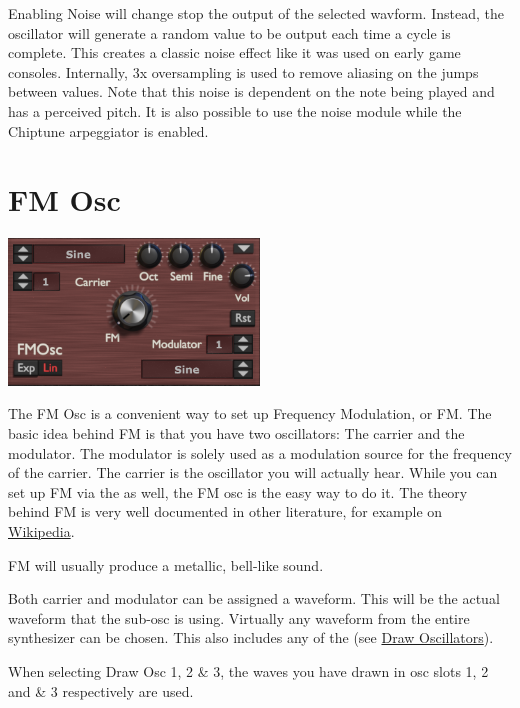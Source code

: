 {Enabling Noise will change stop the output of the selected wavform. Instead, the oscillator will generate a random value to be output each time a cycle is complete. This creates a classic noise effect like it was used on early game consoles. Internally, 3x oversampling is used to remove aliasing on the jumps between values. Note that this noise is dependent on the note being played and has a perceived pitch. It is also possible to use the noise module while the Chiptune arpeggiator is enabled.}

\section{FM Osc}
\begin{center}
    \includegraphics[width=0.5\textwidth]{graphics/fm_osc.png}
\end{center}
The FM Osc is a convenient way to set up Frequency Modulation, or FM. The basic idea behind FM is that you have two oscillators: The carrier and the modulator. The modulator is solely used as a modulation source for the frequency of the carrier. The carrier is the oscillator you will actually hear. While you can set up FM via the \modmatrix as well, the FM osc is the easy way to do it. The theory behind FM is very well documented in other literature, for example on \hyperlink{https://de.wikipedia.org/wiki/FM-Synthese}{Wikipedia}.

FM will usually produce a metallic, bell-like sound.

{Both carrier and modulator can be assigned a waveform. This will be the actual waveform that the sub-osc is using. Virtually any waveform from the entire synthesizer can be chosen. This also includes any of the (see \hyperref[wavedraw]{Draw Oscillators}).

When selecting  Draw Osc 1, 2 \& 3, the waves you have drawn in osc slots 1, 2 and \& 3 respectively are used.}

